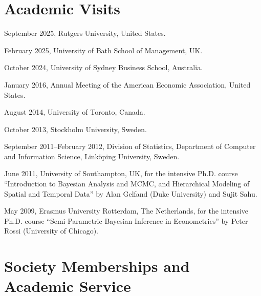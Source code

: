 \documentclass[twoside,a4paper]{article}
\begin{document}
\section{Academic Visits}
\begin{etaremune}[itemsep=0ex,parsep=0pt]
\item September 2025, Rutgers University, United States.
\item February 2025, University of Bath School of Management, UK.
\item October 2024, University of Sydney Business School, Australia.
\item January 2016, Annual Meeting of the American Economic Association, United States.
\item August 2014, University of Toronto, Canada.
\item October 2013, Stockholm University, Sweden.
\item September 2011--February 2012, Division of Statistics, Department of Computer and Information Science, Linköping University, Sweden.
\item June 2011, University of Southampton, UK, for the intensive Ph.D. course ``Introduction to Bayesian Analysis and MCMC, and Hierarchical Modeling of Spatial and Temporal Data'' by Alan Gelfand (Duke University) and Sujit Sahu.
\item May 2009, Erasmus University Rotterdam, The Netherlands, for the intensive Ph.D. course ``Semi-Parametric Bayesian Inference in Econometrics'' by Peter Rossi (University of Chicago).

\end{etaremune}


\section{Society Memberships and Academic Service}
\end{document}
